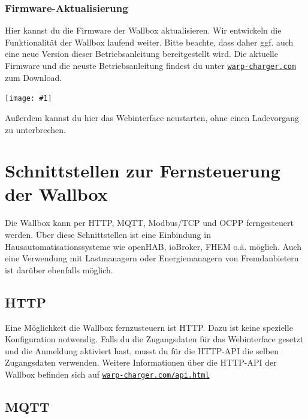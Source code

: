 \documentclass[a4paper,10pt]{article}
\newcommand{\gfx}[1]{\texttt{[image: \#1]}}
\newcommand\rurl[2]{%
  \href{#1}{\nolinkurl{#2}}%
}
\begin{document}
\begin{multicols*}{2}
    \subsubsection{Firmware-Aktualisierung}\label{firmware-update}
    Hier kannst du die Firmware der Wallbox aktualisieren. Wir entwickeln die Funktionalität
    der Wallbox laufend weiter. Bitte beachte, dass daher ggf. auch eine neue
    Version dieser Betriebsanleitung bereitgestellt wird.
    Die aktuelle Firmware und die neuste Betriebsanleitung findest du unter
    \rurl{https://warp-charger.com}{warp-charger.com} zum Download.

    \gfx{./img_warp2/resized/web_firmware_update}

    Außerdem kannst du hier das Webinterface neustarten, ohne einen Ladevorgang zu unterbrechen.

    \newpage

    \section{Schnittstellen zur Fernsteuerung der Wallbox}\label{interfaces}
    Die Wallbox kann per HTTP, MQTT, Modbus/TCP und OCPP ferngesteuert werden. Über diese Schnittstellen ist eine
    Einbindung in Hausautomatisationssysteme wie openHAB, ioBroker, FHEM o.ä.
    möglich. Auch eine Verwendung mit Lastmanagern oder Energiemanagern von Fremdanbietern
    ist darüber ebenfalls möglich.

    \subsection{HTTP}\label{http-interface}
    Eine Möglichkeit die Wallbox fernzusteuern ist HTTP. Dazu ist keine
    spezielle Konfiguration notwendig. Falls du die Zugangsdaten für das Webinterface gesetzt und die Anmeldung aktiviert hast, musst du
    für die HTTP-API die selben Zugangsdaten verwenden.
    Weitere Informationen über die HTTP-API der Wallbox befinden sich auf \rurl{https://warp-charger.com/api.html}{warp-charger.com/api.html}


    \subsection{MQTT}\label{mqtt-interface}


\end{multicols*}
\end{document}
